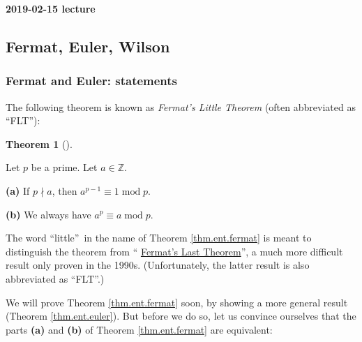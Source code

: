 \documentclass[numbers=enddot,12pt,final,onecolumn,notitlepage]{scrartcl}%
\numberwithin{exer}{subsection}
\theoremstyle{definition}
\newtheorem{theo}{Theorem}[subsection]
\newenvironment{theorem}[1][]
{\begin{theo}[#1]\begin{leftbar}}
{\end{leftbar}\end{theo}}
\begin{document}
\begin{center}
\textbf{2019-02-15 lecture}
\end{center}

\subsection{Fermat, Euler, Wilson}

\subsubsection{Fermat and Euler: statements}

The following theorem is known as \textit{Fermat's Little Theorem} (often
abbreviated as \textquotedblleft FLT\textquotedblright):

\begin{theorem}
\label{thm.ent.fermat}Let $p$ be a prime. Let $a\in\mathbb{Z}$.

\textbf{(a)} If $p\nmid a$, then $a^{p-1}\equiv1\operatorname{mod}p$.

\textbf{(b)} We always have $a^{p}\equiv a\operatorname{mod}p$.
\end{theorem}

The word \textquotedblleft little\textquotedblright\ in the name of Theorem
\ref{thm.ent.fermat} is meant to distinguish the theorem from
\textquotedblleft%
\href{https://en.wikipedia.org/wiki/Fermat's_Last_Theorem}{Fermat's Last
Theorem}\textquotedblright, a much more difficult result only proven in the
1990s. (Unfortunately, the latter result is also abbreviated as
\textquotedblleft FLT\textquotedblright.)

We will prove Theorem \ref{thm.ent.fermat} soon, by showing a more general
result (Theorem \ref{thm.ent.euler}). But before we do so, let us convince
ourselves that the parts \textbf{(a)} and \textbf{(b)} of Theorem
\ref{thm.ent.fermat} are equivalent:
\end{document}
